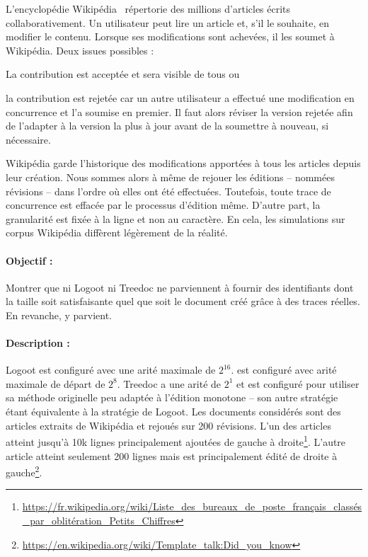 L'encyclopédie Wikipédia~\cite{wikipedia} répertorie des millions d'articles
écrits collaborativement. Un utilisateur peut lire un article et, s'il le
souhaite, en modifier le contenu. Lorsque ses modifications sont achevées, il
les soumet à Wikipédia. Deux issues possibles :
\begin{inparaenum}[(i)]
\item La contribution est acceptée et sera visible de tous ou
\item la contribution est rejetée car un autre utilisateur a effectué une
  modification en concurrence et l'a soumise en premier. Il faut alors réviser
  la version rejetée afin de l'adapter à la version la plus à jour avant de la
  soumettre à nouveau, si nécessaire.
\end{inparaenum}
Wikipédia garde l'historique des modifications apportées à tous les articles
depuis leur création. Nous sommes alors à même de rejouer les éditions --
nommées révisions -- dans l'ordre où elles ont été effectuées. Toutefois, toute
trace de concurrence est effacée par le processus d'édition même. D'autre part,
la granularité est fixée à la ligne et non au caractère. En cela, les
simulations sur corpus Wikipédia diffèrent légèrement de la réalité.


\paragraph{Objectif :} Montrer que ni Logoot ni Treedoc ne parviennent à fournir
des identifiants dont la taille soit satisfaisante quel que soit le document
créé grâce à des traces réelles. En revanche, \LSEQ y parvient.

\paragraph{Description :} Logoot est configuré avec une arité maximale de
$2^{16}$. \LSEQ est configuré avec arité maximale de départ de $2^{8}$. Treedoc
a une arité de $2^1$ et est configuré pour utiliser sa méthode originelle peu
adaptée à l'édition monotone -- son autre stratégie étant équivalente à la
stratégie de Logoot. Les documents considérés sont des articles extraits de
Wikipédia et rejoués sur 200 révisions. L'un des articles atteint jusqu'à 10k
lignes principalement ajoutées de gauche à
droite\footnote{\scriptsize\url{https://fr.wikipedia.org/wiki/Liste_des_bureaux_de_poste_français_classés_par_oblitération_Petits_Chiffres}}. L'autre
article atteint seulement 200 lignes mais est principalement édité de droite à
gauche\footnote{\scriptsize\url{https://en.wikipedia.org/wiki/Template_talk:Did_you_know}}.

